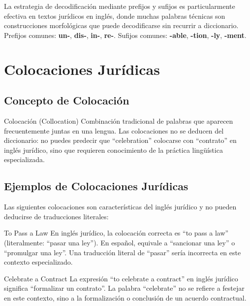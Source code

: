 \documentclass[12pt,oneside]{book}
\begin{document}
\begin{note}
La estrategia de decodificación mediante prefijos y sufijos es particularmente efectiva en textos jurídicos en inglés, donde muchas palabras técnicas son construcciones morfológicas que puede decodificarse sin recurrir a diccionario. Prefijos comunes: \textbf{un-}, \textbf{dis-}, \textbf{in-}, \textbf{re-}. Sufijos comunes: \textbf{-able}, \textbf{-tion}, \textbf{-ly}, \textbf{-ment}.
\end{note}

\section{Colocaciones Jurídicas}

\subsection{Concepto de Colocación}

\begin{definition}{Colocación (Collocation)}
Combinación tradicional de palabras que aparecen frecuentemente juntas en una lengua. Las colocaciones no se deducen del diccionario: no puedes predecir que ``celebration'' colocarse con ``contrato'' en inglés jurídico, sino que requieren conocimiento de la práctica lingüística especializada.
\end{definition}

\subsection{Ejemplos de Colocaciones Jurídicas}

Las siguientes colocaciones son características del inglés jurídico y no pueden deducirse de traducciones literales:

\begin{example}{To Pass a Law}
En inglés jurídico, la colocación correcta es ``to pass a law'' (literalmente: ``pasar una ley''). En español, equivale a ``sancionar una ley'' o ``promulgar una ley''. Una traducción literal de ``pasar'' sería incorrecta en este contexto especializado.
\end{example}

\begin{example}{Celebrate a Contract}
La expresión ``to celebrate a contract'' en inglés jurídico significa ``formalizar un contrato''. La palabra ``celebrate'' no se refiere a festejar en este contexto, sino a la formalización o conclusión de un acuerdo contractual.
\end{example}
\end{document}

